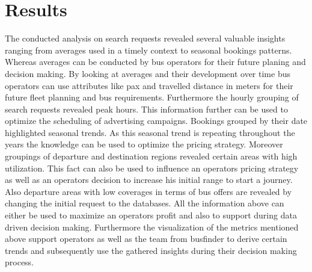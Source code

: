 %
%
% 
% 
% 

\chapter{Results}
\label{chap:results}
The conducted analysis on search requests revealed several valuable insights ranging from averages used in a timely context to seasonal bookings patterns. Whereas averages can be conducted by bus operators for their future planing and decision making. By looking at averages and their development over time bus operators can use attributes like pax and travelled distance in meters for their future fleet planning and bus requirements. Furthermore the hourly grouping of search requests revealed peak hours. This information further can be used to optimize the scheduling of advertising campaigns. Bookings grouped by their date highlighted seasonal trends. As this seasonal trend is repeating throughout the years the knowledge can be used to optimize the pricing strategy. Moreover groupings of departure and destination regions revealed certain areas with high utilization. This fact can also be used to influence an operators pricing strategy as well as an operators decision to increase his initial range to start a journey. Also departure areas with low coverages in terms of bus offers are revealed by changing the initial request to the databases. All the information above can either be used to maximize an operators profit and also to support during data driven decision making. Furthermore the visualization of the metrics mentioned above support operators as well as the team from busfinder to derive certain trends and subsequently use the gathered insights during their decision making process. 
\newline
\newline